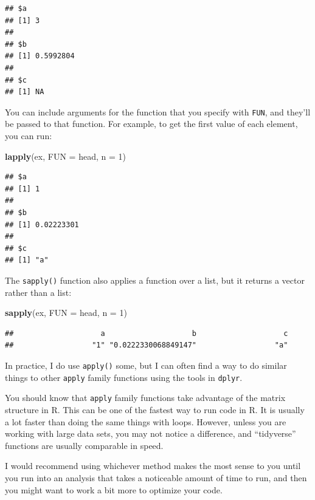 \documentclass[]{book}
\makeatletter
\newenvironment{Shaded}{\begin{snugshade}}{\end{snugshade}}
\newcommand{\KeywordTok}[1]{\textcolor[rgb]{0.13,0.29,0.53}{\textbf{{#1}}}}
\newcommand{\DataTypeTok}[1]{\textcolor[rgb]{0.13,0.29,0.53}{{#1}}}
\newcommand{\DecValTok}[1]{\textcolor[rgb]{0.00,0.00,0.81}{{#1}}}
\newcommand{\NormalTok}[1]{{#1}}
\newenvironment{kframe}{%
\medskip{}
\setlength{\fboxsep}{.8em}
 \def\at@end@of@kframe{}%
 \ifinner\ifhmode%
  \def\at@end@of@kframe{\end{minipage}}%
  \begin{minipage}{\columnwidth}%
 \fi\fi%
 \def\FrameCommand##1{\hskip\@totalleftmargin \hskip-\fboxsep
 \colorbox{shadecolor}{##1}\hskip-\fboxsep
     \hskip-\linewidth \hskip-\@totalleftmargin \hskip\columnwidth}%
 \MakeFramed {\advance\hsize-\width
   \@totalleftmargin\z@ \linewidth\hsize
   \@setminipage}}%
 {\par\unskip\endMakeFramed%
 \at@end@of@kframe}
\renewenvironment{Shaded}{\begin{kframe}}{\end{kframe}}
\makeatother
\begin{document}
\begin{verbatim}
## $a
## [1] 3
## 
## $b
## [1] 0.5992804
## 
## $c
## [1] NA
\end{verbatim}

You can include arguments for the function that you specify with
\texttt{FUN}, and they'll be passed to that function. For example, to
get the first value of each element, you can run:

\begin{Shaded}
\begin{Highlighting}[]
\KeywordTok{lapply}\NormalTok{(ex, }\DataTypeTok{FUN =} \NormalTok{head, }\DataTypeTok{n =} \DecValTok{1}\NormalTok{)}
\end{Highlighting}
\end{Shaded}

\begin{verbatim}
## $a
## [1] 1
## 
## $b
## [1] 0.02223301
## 
## $c
## [1] "a"
\end{verbatim}

The \texttt{sapply()} function also applies a function over a list, but
it returns a vector rather than a list:

\begin{Shaded}
\begin{Highlighting}[]
\KeywordTok{sapply}\NormalTok{(ex, }\DataTypeTok{FUN =} \NormalTok{head, }\DataTypeTok{n =} \DecValTok{1}\NormalTok{)}
\end{Highlighting}
\end{Shaded}

\begin{verbatim}
##                    a                    b                    c 
##                  "1" "0.0222330068849147"                  "a"
\end{verbatim}

In practice, I do use \texttt{apply()} some, but I can often find a way
to do similar things to other \texttt{apply} family functions using the
tools in \texttt{dplyr}. \bigskip

You should know that \texttt{apply} family functions take advantage of
the matrix structure in R. This can be one of the fastest way to run
code in R. It is usually a lot faster than doing the same things with
loops. However, unless you are working with large data sets, you may not
notice a difference, and ``tidyverse'' functions are usually comparable
in speed. \bigskip

I would recommend using whichever method makes the most sense to you
until you run into an analysis that takes a noticeable amount of time to
run, and then you might want to work a bit more to optimize your code.
\bigskip
\end{document}
